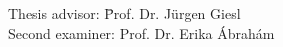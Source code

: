 \documentclass{masterthesis}
\begin{document}
\begin{titlepage}
\begin{center}
  \parbox{2cm}{
    \begin{large}
      \begin{tabbing}
        Thesis advisor: \hspace{1.5cm} \= Prof. Dr. Jürgen Giesl\\
        Second examiner: \> Prof. Dr. Erika Ábrahám\\[1cm]
      \end{tabbing}
    \end{large}
  }
    
\end{center}

\end{titlepage}
\end{document}
